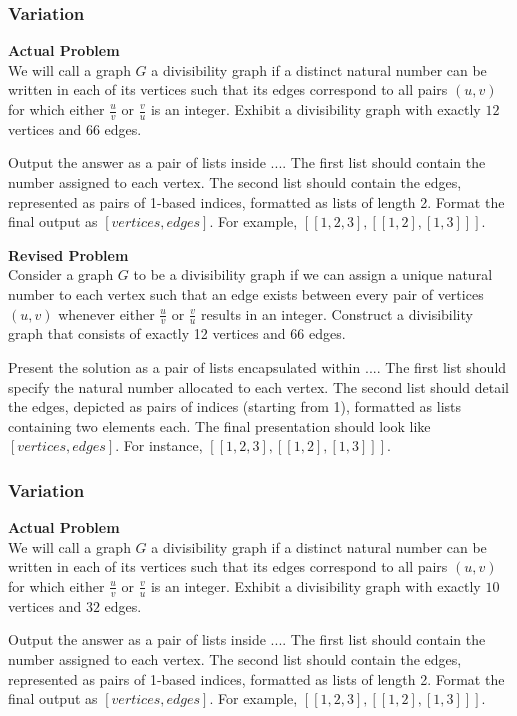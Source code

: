\subsubsection{Variation}
\textbf{Actual Problem}\\
We will call a graph $G$ a divisibility graph if a distinct natural number can be written in each of its vertices such that its edges correspond to all pairs $(u, v)$ for which either $\frac{u}{v}$ or $\frac{v}{u}$ is an integer. Exhibit a divisibility graph with exactly $12$ vertices and $66$ edges.

Output the answer as a pair of lists inside $\boxed{...}$. The first list should contain the number assigned to each vertex. The second list should contain the edges, represented as pairs of 1-based indices, formatted as lists of length 2. Format the final output as $\boxed{[vertices, edges]}$. For example, $\boxed{[[1,2,3], [[1, 2], [1, 3]]]}$.

\textbf{Revised Problem}\\
Consider a graph $G$ to be a divisibility graph if we can assign a unique natural number to each vertex such that an edge exists between every pair of vertices $(u, v)$ whenever either $\frac{u}{v}$ or $\frac{v}{u}$ results in an integer. Construct a divisibility graph that consists of exactly 12 vertices and 66 edges.

Present the solution as a pair of lists encapsulated within $\boxed{...}$. The first list should specify the natural number allocated to each vertex. The second list should detail the edges, depicted as pairs of indices (starting from 1), formatted as lists containing two elements each. The final presentation should look like $\boxed{[vertices, edges]}$. For instance, $\boxed{[[1,2,3], [[1, 2], [1, 3]]]}$.

\subsubsection{Variation}
\textbf{Actual Problem}\\
We will call a graph $G$ a divisibility graph if a distinct natural number can be written in each of its vertices such that its edges correspond to all pairs $(u, v)$ for which either $\frac{u}{v}$ or $\frac{v}{u}$ is an integer. Exhibit a divisibility graph with exactly $10$ vertices and $32$ edges.

Output the answer as a pair of lists inside $\boxed{...}$. The first list should contain the number assigned to each vertex. The second list should contain the edges, represented as pairs of 1-based indices, formatted as lists of length 2. Format the final output as $\boxed{[vertices, edges]}$. For example, $\boxed{[[1,2,3], [[1, 2], [1, 3]]]}$.

